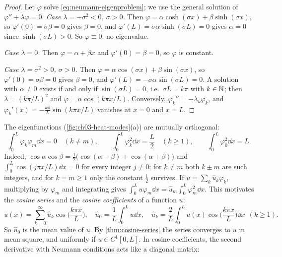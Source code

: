 \begin{proof}
Let $\varphi$ solve \eqref{eq:neumann-eigenproblem}; we use the general solution of
$\varphi''+\lambda\varphi=0$. \emph{Case $\lambda=-\sigma^2<0$, $\sigma>0$.} Then
$\varphi=\alpha\cosh(\sigma x)+\beta\sinh(\sigma x)$, so
$\varphi'(0)=\sigma\beta=0$ gives $\beta=0$, and
$\varphi'(L)=\sigma\alpha\sinh(\sigma L)=0$ gives $\alpha=0$ since
$\sinh(\sigma L)>0$. So $\varphi\equiv0$: no eigenvalue.

\emph{Case $\lambda=0$.} Then $\varphi=\alpha+\beta x$ and $\varphi'(0)=\beta=0$, so
$\varphi$ is constant.

\emph{Case $\lambda=\sigma^2>0$, $\sigma>0$.} Then
$\varphi=\alpha\cos(\sigma x)+\beta\sin(\sigma x)$, so $\varphi'(0)=\sigma\beta=0$
gives $\beta=0$, and $\varphi'(L)=-\sigma\alpha\sin(\sigma L)=0$. A solution with
$\alpha\neq0$ exists if and only if $\sin(\sigma L)=0$, i.e.\ $\sigma L=k\pi$ with
$k\in\mathbb{N}$; then $\lambda=(k\pi/L)^2$ and $\varphi=\alpha\cos(k\pi x/L)$. Conversely,
$\varphi_k''=-\lambda_k\varphi_k$, and $\varphi_k'(x)=-\frac{k\pi}{L}\sin(k\pi x/L)$
vanishes at $x=0$ and $x=L$.
\end{proof}

The eigenfunctions (\cref{fig:ch03-heat-modes}(a)) are mutually orthogonal:
\begin{equation}\label{eq:diffusion-orthogonality}
  \int_0^L\varphi_k\varphi_m\dd x = 0\quad (k\neq m),\qquad
  \int_0^L\varphi_k^2\dd x = \frac L2\quad (k\ge1),\qquad
  \int_0^L\varphi_0^2\dd x = L .
\end{equation}
Indeed, $\cos\alpha\cos\beta=\frac12\big(\cos(\alpha-\beta)+\cos(\alpha+\beta)\big)$
and $\int_0^L\cos(j\pi x/L)\dd x=0$ for every integer $j\neq0$; for $k\neq m$ both
$k\pm m$ are such integers, and for $k=m\ge1$ only the constant $\frac12$ survives.
If $u=\sum_k\hat u_k\varphi_k$, multiplying by $\varphi_m$ and integrating gives
$\int_0^Lu\varphi_m\dd x=\hat u_m\int_0^L\varphi_m^2\dd x$. This motivates the
\emph{cosine series} and the \emph{cosine coefficients} of a function $u$:
\begin{equation}\label{eq:cosine-coefficients}
  u(x) = \sum_{k=0}^\infty\hat u_k\cos\Big(\frac{k\pi x}{L}\Big),\quad
  \hat u_0 = \frac1L\int_0^L u\dd x,\quad
  \hat u_k = \frac2L\int_0^L u(x)\cos\Big(\frac{k\pi x}{L}\Big)\dd x\ \ (k\ge1).
\end{equation}
So $\hat u_0$ is the mean value of $u$. By \cref{thm:cosine-series} the series
converges to $u$ in mean square, and uniformly if $u\in C^1[0,L]$. In cosine
coefficients, the second derivative with Neumann
conditions acts like a diagonal matrix:

